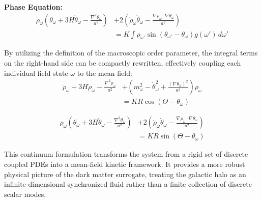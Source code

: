 \textbf{Phase Equation:}
\begin{equation}
    \begin{aligned}
        \rho_\omega \left(\ddot{\theta}_\omega + 3H\dot{\theta}_\omega - \frac{\nabla^2\theta_\omega}{a^2}\right)
        &+ 2\left(\dot{\rho}_\omega\dot{\theta}_\omega - \frac{\nabla\rho_\omega\cdot\nabla\theta_\omega}{a^2}\right) \\
        &= K \int \rho_{\omega'} \sin(\theta_{\omega'} - \theta_\omega) g(\omega') \, d\omega'
    \end{aligned}
\end{equation}

By utilizing the definition of the macroscopic order parameter, the integral terms on the right-hand side can be compactly rewritten, effectively coupling each individual field state $\omega$ to the mean field:
\begin{equation}
    \begin{aligned}
        \ddot{\rho}_\omega + 3H\dot{\rho}_\omega - \frac{\nabla^2\rho_\omega}{a^2}
        &+ \left( m_\omega^2 - \dot{\theta}_\omega^2 + \frac{(\nabla\theta_\omega)^2}{a^2} \right)\rho_\omega \\
        &= K R \cos(\Theta - \theta_\omega)
    \end{aligned}
\end{equation}

\begin{equation}
    \begin{aligned}
        \rho_\omega \left(\ddot{\theta}_\omega + 3H\dot{\theta}_\omega - \frac{\nabla^2\theta_\omega}{a^2}\right)
        &+ 2\left(\dot{\rho}_\omega\dot{\theta}_\omega - \frac{\nabla\rho_\omega\cdot\nabla\theta_\omega}{a^2}\right) \\
        &= K R \sin(\Theta - \theta_\omega)
    \end{aligned}
\end{equation}

This continuum formulation transforms the system from a rigid set of discrete coupled PDEs into a mean-field kinetic framework. It provides a more robust physical picture of the dark matter surrogate, treating the galactic halo as an infinite-dimensional synchronized fluid rather than a finite collection of discrete scalar modes.
